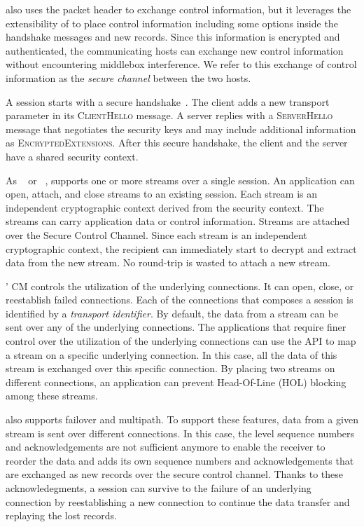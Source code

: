 \tcpls also uses the packet
header to exchange \tcp control information, but it leverages the extensibility
of  to place control information including some \tcp options inside the
\tls handshake messages and new \tls records. Since this information is
encrypted and authenticated, the communicating hosts can exchange new control
information without encountering middlebox interference. We refer to this
exchange of control information as the \textit{secure channel} between the two hosts.

A \tcpls session starts with a secure  handshake~\cite{rfc8446}. The
client adds a new \tcpls transport parameter in its \textsc{ClientHello}
message. A \tcpls server replies with a \textsc{ServerHello} message that
negotiates the security keys and may include additional \tcpls information as
\textsc{EncryptedExtensions}. After this secure handshake, the client and the
server have a shared security context.

As \sctp~\cite{rfc4960} or \quic~\cite{draft-ietf-quic-transport}, \tcpls
supports one or more streams over a single \tcpls session. An application can
open, attach, and close streams to an existing \tcpls session. Each stream is an
independent cryptographic context derived from the \tcpls security context. The
\tcpls streams can carry application data or control information.
Streams are attached over the Secure Control Channel. Since each stream is an
independent cryptographic context, the recipient can immediately start to
decrypt and extract data from the new stream. No round-trip is wasted to attach
a new stream.

\tcpls' CM controls the utilization of the underlying \tcp connections. It can open, close, or reestablish failed \tcp connections. Each of the connections that composes a \tcpls session is identified by a \emph{transport identifier}. By default, the data from a stream can be sent over any of the underlying \tcp connections. The applications that require finer control over the utilization of the underlying \tcp connections can use the \tcpls API to map a stream on a specific underlying connection. In this case, all the data of this stream is exchanged over this specific connection. By placing two streams on different connections, an application can prevent Head-Of-Line (HOL) blocking among these streams.

\tcpls also supports failover and multipath. To support these features, data
from a given stream is sent over different \tcp connections. In
this case, the \tcp level sequence numbers and acknowledgements are not
sufficient anymore to enable the receiver to reorder the data and \tcpls
adds its own sequence numbers and acknowledgements that are exchanged as
new \tls records over the secure control channel. Thanks to these \tcpls acknowledegments, a \tcpls session can survive to the failure of an underlying \tcp connection by reestablishing a new \tcp connection to continue the data transfer and replaying the lost records.

